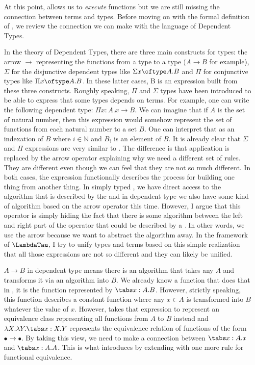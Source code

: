 At this point, \betareduction allows us to \textit{execute} functions but we are still missing the connection between terms and types. Before moving on with the formal definition of \taureduction, we review the connection we can make with the language of Dependent Types.

In the theory of Dependent Types, there are three main constructs for types: the arrow $\to$ representing the functions from a type to a type ($A \to B$ for example), $\Sigma$ for the disjunctive dependent types like $\Sigma x \oftype A.B$ and $\Pi$ for conjunctive types like $\Pi x \oftype A.B$. In these latter cases, B is an expression built from these three constructs. Roughly speaking, $\Pi$ and $\Sigma$ types have been introduced to be able to express that some types depends on terms. For example, one can write the following dependent type: $\Pi x:A.x \to B$. We can imagine that if $A$ is the set of natural number, then this expression would somehow represent the set of functions from each natural number to a set $B$. One can interpret that as an indexation of $B$ where $i \in \mathbb{N}$ and $B_i$ is an element of $B$. It is already clear that $\Sigma$ and $\Pi$ expressions are very similar to \lambdaterms. The difference is that application is replaced by the arrow operator explaining why we need a different set of rules. They are different even though we can feel that they are not so much different. In both cases, the expression functionally describes the process for building one thing from another thing. In simply typed \lambdacalc, we have direct access to the algorithm that is described by the \lambdaexpr and in dependent type we also have some kind of algorithm based on the arrow operator this time. However, I argue that this operator is simply hiding the fact that there is some algorithm between the left and right part of the operator that could be described by a \lambdaexpr. In other words, we use the arrow because we want to abstract the algorithm away. In the framework of $\LambdaTau$, I try to unify types and terms based on this simple realization that all those expressions are not so different and they can likely be unified.

$A \to B$ in dependent type means there is an algorithm that takes any $A$ and transforms it via an algorithm into $B$. We already know a function that does that in \lambdaterms, it is the function represented by $\tabs x:A.B$. However, strictly speaking, this function describes a constant function where any $x \in A$ is transformed into $B$ whatever the value of $x$. However, \lambdatypes takes that expression to represent an equivalence class representing all functions from $A$ to $B$ instead and $\lambda X.\lambda Y.\tabs x:X.Y$ represents the equivalence relation of functions of the form $\bullet \to \bullet$. By taking this view, we need to make a connection between $\tabs x:A.x$ and $\tabs x:A.A$. This is what \taureduction introduces by extending \betareduction with one more rule for functional equivalence.

